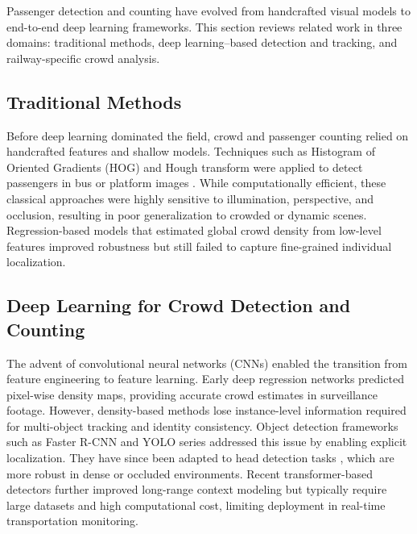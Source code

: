 Passenger detection and counting have evolved from handcrafted visual models to end-to-end deep learning frameworks. This section reviews related work in three domains: traditional methods, deep learning–based detection and tracking, and railway-specific crowd analysis.

\subsection{Traditional Methods}
Before deep learning dominated the field, crowd and passenger counting relied on handcrafted features and shallow models. Techniques such as Histogram of Oriented Gradients (HOG) and Hough transform were applied to detect passengers in bus or platform images \cite{30_khan_passenger_2020,73_Huofu}. While computationally efficient, these classical approaches were highly sensitive to illumination, perspective, and occlusion, resulting in poor generalization to crowded or dynamic scenes. Regression-based models that estimated global crowd density from low-level features \cite{zhang2016single,li2018csrnet} improved robustness but still failed to capture fine-grained individual localization.

\subsection{Deep Learning for Crowd Detection and Counting}
The advent of convolutional neural networks (CNNs) enabled the transition from feature engineering to feature learning. Early deep regression networks \cite{zhang2016single,li2018csrnet} predicted pixel-wise density maps, providing accurate crowd estimates in surveillance footage. However, density-based methods lose instance-level information required for multi-object tracking and identity consistency.  
Object detection frameworks such as Faster R-CNN and YOLO series \cite{redmon2016you,bochkovskiy2020yolov4,74_yolo11_Jocher_Ultralytics_YOLO_2023} addressed this issue by enabling explicit localization. They have since been adapted to head detection tasks \cite{shao2018crowdhuman}, which are more robust in dense or occluded environments. Recent transformer-based detectors further improved long-range context modeling but typically require large datasets and high computational cost, limiting deployment in real-time transportation monitoring.

